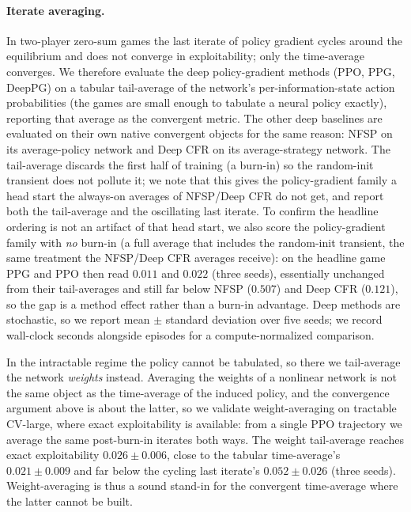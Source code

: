 \documentclass[11pt,a4paper]{article}
\begin{document}
\paragraph{Iterate averaging.} In two-player zero-sum games the last iterate of
policy gradient cycles around the equilibrium and does not converge in
exploitability; only the time-average converges. We therefore evaluate the deep
policy-gradient methods (PPO, PPG, DeepPG) on a tabular tail-average of the network's
per-information-state action probabilities (the games are small enough to tabulate a
neural policy exactly), reporting that average as the convergent metric. The other
deep baselines are evaluated on their own native convergent objects for the same
reason: NFSP on its average-policy network and Deep CFR on its average-strategy
network. The tail-average discards the first half of training (a burn-in) so the
random-init transient does not pollute it; we note that this gives the
policy-gradient family a head start the always-on averages of NFSP/Deep CFR do not
get, and report both the tail-average and the oscillating last iterate. To confirm the
headline ordering is not an artifact of that head start, we also score the
policy-gradient family with \emph{no} burn-in (a full average that includes the
random-init transient, the same treatment the NFSP/Deep CFR averages receive): on the
headline game PPG and PPO then read $0.011$ and $0.022$ (three seeds), essentially
unchanged from their tail-averages and still far below NFSP ($0.507$) and Deep CFR
($0.121$), so the gap is a method effect rather than a burn-in advantage. Deep methods
are stochastic, so we report mean $\pm$ standard deviation over five seeds; we record
wall-clock seconds alongside episodes for a compute-normalized comparison.

In the intractable regime the policy cannot be tabulated, so there we tail-average the
network \emph{weights} instead. Averaging the weights of a nonlinear network is not the
same object as the time-average of the induced policy, and the convergence argument
above is about the latter, so we validate weight-averaging on tractable CV-large, where
exact exploitability is available: from a single PPO trajectory we average the same
post-burn-in iterates both ways. The weight tail-average reaches exact exploitability
$0.026 \pm 0.006$, close to the tabular time-average's $0.021 \pm 0.009$ and far below
the cycling last iterate's $0.052 \pm 0.026$ (three seeds). Weight-averaging is thus a
sound stand-in for the convergent time-average where the latter cannot be built.
\end{document}
